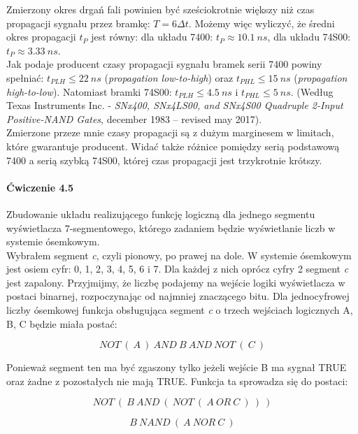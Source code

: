 \documentclass[14pt, table]{extarticle}
\begin{document}
Zmierzony okres drgań fali powinien być sześciokrotnie większy niż czas propagacji sygnału przez bramkę: $T = 6 \Delta t$. Możemy więc wyliczyć, że średni okres propagacji $t_P$ jest równy: dla układu 7400: $t_P \approx 10.1 \ ns$, dla układu 74S00: $t_P \approx 3.33 \ ns$. \\ 

Jak podaje producent czasy propagacji sygnału bramek serii 7400 powiny spełniać: $t_{PLH} \leq 22 \ ns$ (\textit{propagation low-to-high}) oraz $t_{PHL} \leq 15 \ ns$ (\textit{propagation high-to-low}). Natomiast bramki 74S00: $t_{PLH} \leq 4.5 \ ns$ i $t_{PHL} \leq 5 \ ns$. (Według Texas Instruments Inc. - \textit{SNx400, SNx4LS00, and SNx4S00 Quadruple 2-Input Positive-NAND Gates}, december 1983 – revised may 2017). \\

Zmierzone przeze mnie czasy propagacji są z dużym marginesem w limitach, które gwarantuje producent. Widać także różnice pomiędzy serią podstawową 7400 a serią szybką 74S00, której czas propagacji jest trzykrotnie krótszy.

\newpage
\paragraph{Ćwiczenie 4.5 \\}
Zbudowanie układu realizującego funkcję logiczną dla jednego segmentu wyświetlacza 7-segmentowego, którego zadaniem będzie wyświetlanie liczb w systemie ósemkowym. \\

Wybrałem segment \textit{c}, czyli pionowy, po prawej na dole. W systemie ósemkowym jest osiem cyfr: 0, 1, 2, 3, 4, 5, 6 i 7. Dla każdej z nich oprócz cyfry 2 segment \textit{c} jest zapalony. Przyjmijmy, że liczbę podajemy na wejście logiki wyświetlacza w postaci binarnej, rozpoczynając od najmniej znaczącego bitu. Dla jednocyfrowej liczby ósemkowej funkcja obsługująca segment \textit{c} o trzech wejściach logicznych A, B, C będzie miała postać:

$$ NOT \ ( \ \textit{A} \ ) \ AND \ \textit{B} \ AND \ NOT \ ( \ \textit{C} \ ) $$

Ponieważ segment ten ma być zgaszony tylko jeżeli wejście B ma sygnał TRUE oraz żadne z pozostałych nie mają TRUE. Funkcja ta sprowadza się do postaci:

$$ NOT \ ( \ \textit{B} \ AND \ ( \ NOT \ ( \ \textit{A} \ OR \ \textit{C} \ ) \ ) \ ) $$

$$ \textit{B} \ NAND \ ( \ \textit{A} \ NOR \ \textit{C} \ ) $$
\end{document}

